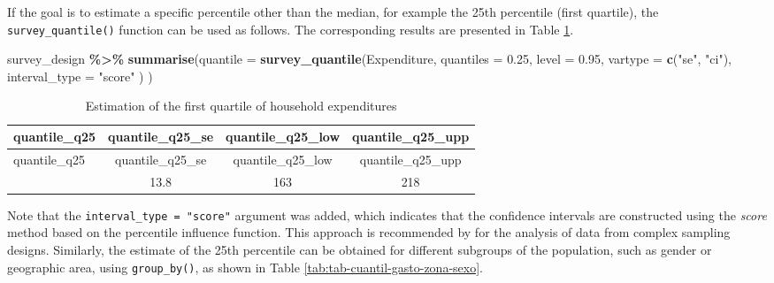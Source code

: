 \documentclass[
  english,
  12pt,
]{book}
\newenvironment{Shaded}{\begin{snugshade}}{\end{snugshade}}
\newcommand{\AttributeTok}[1]{\textcolor[rgb]{0.13,0.29,0.53}{#1}}
\newcommand{\FloatTok}[1]{\textcolor[rgb]{0.00,0.00,0.81}{#1}}
\newcommand{\FunctionTok}[1]{\textcolor[rgb]{0.13,0.29,0.53}{\textbf{#1}}}
\newcommand{\NormalTok}[1]{#1}
\newcommand{\SpecialCharTok}[1]{\textcolor[rgb]{0.81,0.36,0.00}{\textbf{#1}}}
\newcommand{\StringTok}[1]{\textcolor[rgb]{0.31,0.60,0.02}{#1}}
\begin{document}
If the goal is to estimate a specific percentile other than the median, for example the 25th percentile (first quartile), the \texttt{survey\_quantile()} function can be used as follows. The corresponding results are presented in Table \ref{tab:tab-cuantil-gasto}.

\begin{Shaded}
\begin{Highlighting}[]
\NormalTok{survey\_design }\SpecialCharTok{\%\textgreater{}\%}
  \FunctionTok{summarise}\NormalTok{(}\AttributeTok{quantile =} \FunctionTok{survey\_quantile}\NormalTok{(Expenditure,}
                                \AttributeTok{quantiles =} \FloatTok{0.25}\NormalTok{,}
                                \AttributeTok{level =} \FloatTok{0.95}\NormalTok{,}
                                \AttributeTok{vartype =} \FunctionTok{c}\NormalTok{(}\StringTok{"se"}\NormalTok{, }\StringTok{"ci"}\NormalTok{),}
                                \AttributeTok{interval\_type =} \StringTok{"score"}
\NormalTok{                                )}
\NormalTok{            )}
\end{Highlighting}
\end{Shaded}

\begin{longtable}[]{@{}lccc@{}}
\caption{\label{tab:tab-cuantil-gasto}Estimation of the first quartile of household expenditures}\tabularnewline
\toprule\noalign{}
quantile\_q25 & quantile\_q25\_se & quantile\_q25\_low & quantile\_q25\_upp \\
\midrule\noalign{}
\endfirsthead
\toprule\noalign{}
quantile\_q25 & quantile\_q25\_se & quantile\_q25\_low & quantile\_q25\_upp \\
\midrule\noalign{}
\endhead
\bottomrule\noalign{}
\endlastfoot
200 & 13.8 & 163 & 218 \\
\end{longtable}

Note that the \texttt{interval\_type\ =\ "score"} argument was added, which indicates that the confidence intervals are constructed using the \emph{score} method based on the percentile influence function. This approach is recommended by \citet{Lumley2010} for the analysis of data from complex sampling designs. Similarly, the estimate of the 25th percentile can be obtained for different subgroups of the population, such as gender or geographic area, using \texttt{group\_by()}, as shown in Table \ref{tab:tab-cuantil-gasto-zona-sexo}.
\end{document}
